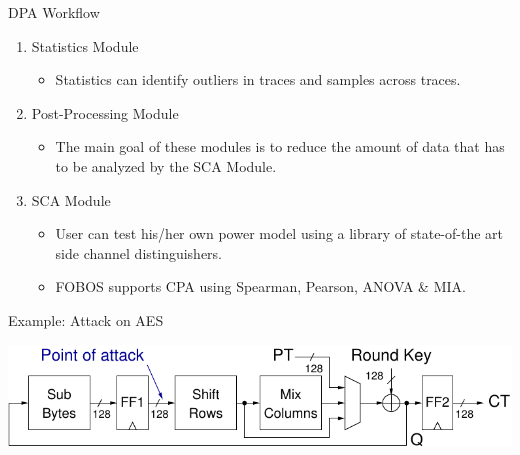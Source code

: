 \documentclass[xcolor=pdftex,dvipsnames,table,final]{beamer}
\begin{document}
\begin{frame}[fragile]{}
\begin{columns}[t]
\begin{column}{.31\linewidth}
\begin{block}{DPA Workflow}
\begin{center}
        \end{center} 
        \vspace{-1ex}
        \begin{enumerate}
          \item Statistics Module
          \begin{itemize}
            \item Statistics can identify outliers in traces and samples across traces.
          \end{itemize}
          \item Post-Processing Module
          \begin{itemize}
            \item The main goal of these modules is to reduce the amount of data that 
                  has to be analyzed by the SCA Module.
          \end{itemize}
          \item SCA Module
          \begin{itemize}
            \item User can test his/her own power model using a library of state-of-the art side channel
                  distinguishers.
            \item FOBOS supports CPA using Spearman, Pearson, ANOVA \& MIA.
          \end{itemize}
        \end{enumerate}

       \end{block}
       
       \begin{block}{Example: Attack on AES}
        \vspace{-1ex}
         \begin{center}
           \includegraphics[width=0.9\linewidth]{../figures/aes128}


\end{center}
\end{block}
\end{column}
\end{columns}
\end{frame}
\end{document}
